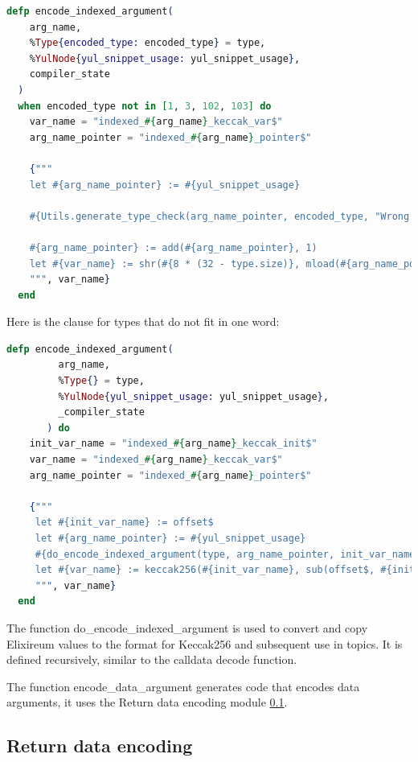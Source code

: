 \begin{lstlisting}[language=elixir, caption={Encode word-size indexed argument}, label={lst:encode_indexed_argument}]
  defp encode_indexed_argument(
    arg_name,
    %Type{encoded_type: encoded_type} = type,
    %YulNode{yul_snippet_usage: yul_snippet_usage},
    compiler_state
  )
  when encoded_type not in [1, 3, 102, 103] do
    var_name = "indexed_#{arg_name}_keccak_var$"
    arg_name_pointer = "indexed_#{arg_name}_pointer$"

    {"""
    let #{arg_name_pointer} := #{yul_snippet_usage}

    #{Utils.generate_type_check(arg_name_pointer, encoded_type, "Wrong type for indexed argument #{arg_name}", compiler_state.uniqueness_provider)}

    #{arg_name_pointer} := add(#{arg_name_pointer}, 1)
    let #{var_name} := shr(#{8 * (32 - type.size)}, mload(#{arg_name_pointer}))
    """, var_name}  
  end
\end{lstlisting}

Here is the clause for types that do not fit in one word:

\begin{lstlisting}[language=elixir, caption={Encode compex type indexed argument}, label={lst:encode_indexed_argument}]
  defp encode_indexed_argument(
         arg_name,
         %Type{} = type,
         %YulNode{yul_snippet_usage: yul_snippet_usage},
         _compiler_state
       ) do
    init_var_name = "indexed_#{arg_name}_keccak_init$"
    var_name = "indexed_#{arg_name}_keccak_var$"
    arg_name_pointer = "indexed_#{arg_name}_pointer$"

    {"""
     let #{init_var_name} := offset$
     let #{arg_name_pointer} := #{yul_snippet_usage}
     #{do_encode_indexed_argument(type, arg_name_pointer, init_var_name, 0)}
     let #{var_name} := keccak256(#{init_var_name}, sub(offset$, #{init_var_name}))
     """, var_name}
  end
\end{lstlisting}

The function do\_encode\_indexed\_argument is used to convert and copy Elixireum values to the format for Keccak256 and subsequent use in topics. It is defined recursively, similar to the calldata decode function.


The function encode\_data\_argument generates code that encodes data arguments, it uses the Return data encoding module \ref{ssec:return_data_encoding}. 


\subsection{Return data encoding}
\label{ssec:return_data_encoding}

